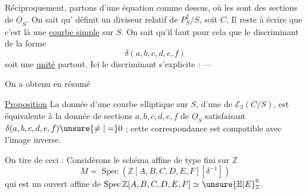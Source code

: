 
Réciproquement, partons d'une équation comme dessus, où les  sont des sections de $\underline O_S$. On sait qu' définit un diviseur relatif  de $P_S^2/S$, soit $C$. Il reste à écrire que c'est là une \uline{courbe simple} sur $S$. On sait qu'il faut pour cela que le discriminant de la forme
\[
\delta(a,b,c,d,e,f)
\]
soit une \uline{unité} partout. Ici le discriminant s'explicite : ---

On a obtenu en résumé

\uline{Proposition} La donnée d'une courbe elliptique sur $S$,  d'une  de $\mathcal E_3(C/S)$,  est équivalente à la donnée de sections $a,b,c,d,e,f$ de $\underline O_S$ satisfaisant $\delta(a,b,c,d,e,f)\unsure{\neq|=}0$ ; cette correspondance est compatible avec l'image inverse.

On tire de ceci : Considérons le schéma affine de type fini sur $\mathbb Z$
\[
M=\operatorname{Spec}(\mathbb Z[A,B,C,D,E,F][\delta^{-1}])
\]
qui est un ouvert affine de $\operatorname{Spec}\mathbb Z[A,B,C,D,E,F]\simeq \unsure{\mathbb E|E}_{\mathbb Z}^6$. 
